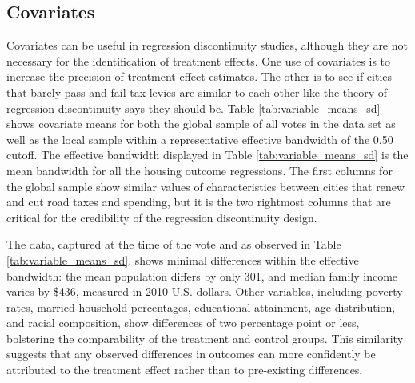 \subsection{Covariates}

Covariates can be useful in regression discontinuity studies, although they are not necessary for the identification of treatment effects.  One use of covariates is to increase the precision of treatment effect estimates.  The other is to see if cities that barely pass and fail tax levies are similar to each other like the theory of regression discontinuity says they should be. Table \ref{tab:variable_means_sd} shows covariate means for both the global sample of all votes in the data set as well as the local sample within a representative effective bandwidth of the 0.50 cutoff. The effective bandwidth displayed in Table \ref{tab:variable_means_sd} is the mean bandwidth for all the housing outcome regressions. The first columns for the global sample show similar values of characteristics between cities that renew and cut road taxes and spending, but it is the two rightmost columns that are critical for the credibility of the regression discontinuity design.   

The data, captured at the time of the vote and as observed in Table \ref{tab:variable_means_sd}, shows minimal differences within the effective bandwidth: the mean population differs by only 301, and median family income varies by \$436, measured in 2010 U.S. dollars. Other variables, including poverty rates, married household percentages, educational attainment, age distribution, and racial composition, show differences of two percentage point or less, bolstering the comparability of the treatment and control groups. This similarity suggests that any observed differences in outcomes can more confidently be attributed to the treatment effect rather than to pre-existing differences.

